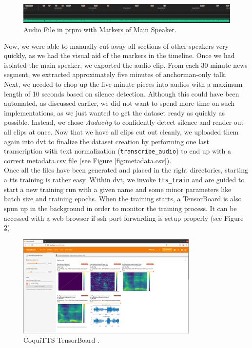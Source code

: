 \documentclass[
  a4paper,  %
  twoside,  %
  bibliography=totoc,
  headsepline,
  cleardoublepage=empty,
  parskip=half,
  draft=false
]{scrbook}
\begin{document}
\begin{figure}[h]
  \centering
  \includegraphics[width=1\textwidth]{./graphics/tts/premier with markers.png}
  \caption{Audio File in \gls{prpro} with Markers of Main Speaker.}
  \label{fig:premier-markers}
\end{figure}

Now, we were able to manually cut away all sections of other speakers very quickly, as we had the visual aid of the markers in the timeline. Once we had isolated the main speaker, we exported the audio clip. From each 30-minute news segment, we extracted approximately five minutes of anchorman-only talk.\\
Next, we needed to chop up the five-minute pieces into audios with a maximum length of 10 seconds based on silence detection. Although this could have been automated, as discussed earlier, we did not want to spend more time on such implementations, as we just wanted to get the dataset ready as quickly as possible. Instead, we chose \textit{Audacity} to confidently detect silence and render out all clips at once. Now that we have all clips cut out cleanly, we uploaded them again into \gls{dvt} to finalize the dataset creation by performing one last transcription with text normalization (\verb|transcribe_audio|) to end up with a correct metadata.csv file (see Figure \ref{fig:metadata.csv}). \\
Once all the files have been generated and placed in the right directories, starting a \gls{tts} training is rather easy. Within \gls{dvt}, we invoke \verb|tts_train| and are guided to start a new training run with a given name and some minor parameters like batch size and training epochs. When the training starts, a TensorBoard is also spun up in the background in order to monitor the training process. It can be accessed with a web browser if \gls{ssh} port forwarding is setup properly (see Figure \ref{fig:tensorboard}).

\begin{figure}[h]
  \centering
  \includegraphics[width=0.8\textwidth]{./graphics/tts/tensorboard.png}
  \caption{CoquiTTS TensorBoard \cite{TensorboardPngMbarnig2022}.}
  \label{fig:tensorboard}
\end{figure}
\end{document}
